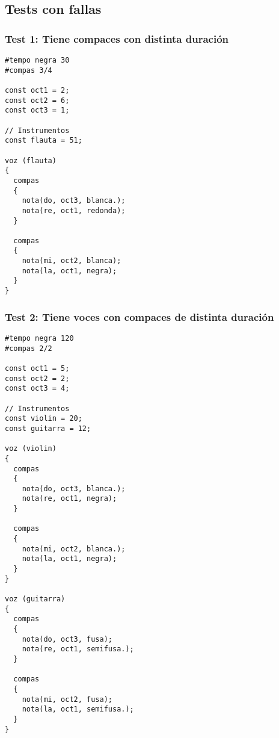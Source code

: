 
\subsection{Tests con fallas}

\subsubsection{Test 1: Tiene compaces con distinta duración}

\begin{lstlisting}
#tempo negra 30
#compas 3/4

const oct1 = 2;
const oct2 = 6;
const oct3 = 1;

// Instrumentos
const flauta = 51;

voz (flauta)
{
  compas
  {
    nota(do, oct3, blanca.);
    nota(re, oct1, redonda);
  }

  compas
  {
    nota(mi, oct2, blanca);
    nota(la, oct1, negra);
  }
}
\end{lstlisting}
\vspace{5mm}

\subsubsection{Test 2: Tiene voces con compaces de distinta duración}

\begin{lstlisting}
#tempo negra 120
#compas 2/2

const oct1 = 5;
const oct2 = 2;
const oct3 = 4;

// Instrumentos
const violin = 20;
const guitarra = 12;

voz (violin)
{
  compas
  {
    nota(do, oct3, blanca.);
    nota(re, oct1, negra);
  }

  compas
  {
    nota(mi, oct2, blanca.);
    nota(la, oct1, negra);
  }
}

voz (guitarra)
{
  compas
  {
    nota(do, oct3, fusa);
    nota(re, oct1, semifusa.);
  }

  compas
  {
    nota(mi, oct2, fusa);
    nota(la, oct1, semifusa.);
  }
}
\end{lstlisting}
\vspace{5mm}

